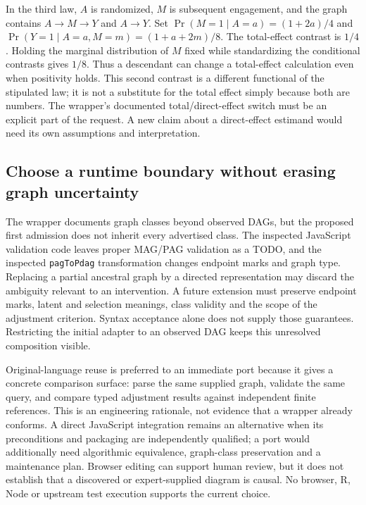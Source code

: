 In the third law, \(A\) is randomized, \(M\) is subsequent engagement,
and the graph contains \(A\to M\to Y\) and \(A\to Y\). Set
\(\Pr(M=1\mid A=a)=(1+2a)/4\) and
\(\Pr(Y=1\mid A=a,M=m)=(1+a+2m)/8\). The total-effect contrast is
\(1/4\). Holding the marginal distribution of \(M\) fixed while
standardizing the conditional contrasts gives \(1/8\). Thus a descendant
can change a total-effect calculation even when positivity holds. This
second contrast is a different functional of the stipulated law; it is
not a substitute for the total effect simply because both are numbers.
The wrapper's documented total/direct-effect switch must be an explicit
part of the request. A new claim about a direct-effect estimand would
need its own assumptions and interpretation. \citep{exec18_gp_graph_reference,exec18_gp_dagitty}

\subsection{Choose a runtime boundary without erasing graph uncertainty}

The wrapper documents graph classes beyond observed DAGs, but the proposed
first admission does not inherit every advertised class. The inspected
JavaScript validation code leaves proper MAG/PAG validation as a TODO, and
the inspected \texttt{pagToPdag} transformation changes endpoint marks and
graph type. Replacing a partial ancestral graph by a directed representation
may discard the ambiguity relevant to an intervention. A future extension
must preserve endpoint marks, latent and selection meanings, class validity
and the scope of the adjustment criterion. Syntax acceptance alone does not
supply those guarantees. Restricting the initial adapter to an observed DAG
keeps this unresolved composition visible. \citep{exec18_gp_dagitty}

Original-language reuse is preferred to an immediate port because it gives
a concrete comparison surface: parse the same supplied graph, validate the
same query, and compare typed adjustment results against independent finite
references. This is an engineering rationale, not evidence that a wrapper
already conforms. A direct JavaScript integration remains an alternative
when its preconditions and packaging are independently qualified; a port
would additionally need algorithmic equivalence, graph-class preservation
and a maintenance plan. Browser editing can support human review, but it
does not establish that a discovered or expert-supplied diagram is causal.
No browser, R, Node or upstream test execution supports the current choice.
\citep{exec18_gp_dagitty}

